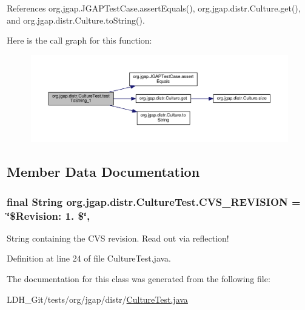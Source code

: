 References org.\-jgap.\-J\-G\-A\-P\-Test\-Case.\-assert\-Equals(), org.\-jgap.\-distr.\-Culture.\-get(), and org.\-jgap.\-distr.\-Culture.\-to\-String().



Here is the call graph for this function\-:
\nopagebreak
\begin{figure}[H]
\begin{center}
\leavevmode
\includegraphics[width=350pt]{classorg_1_1jgap_1_1distr_1_1_culture_test_a6d9643ccf90e461089fb2f6c8d7be6de_cgraph}
\end{center}
\end{figure}




\subsection{Member Data Documentation}
\hypertarget{classorg_1_1jgap_1_1distr_1_1_culture_test_a65511b98b2face0a144246cd3d2e6154}{
\subsubsection[{C\-V\-S\-\_\-\-R\-E\-V\-I\-S\-I\-O\-N}]{\setlength{\rightskip}{0pt plus 5cm}final String org.\-jgap.\-distr.\-Culture\-Test.\-C\-V\-S\-\_\-\-R\-E\-V\-I\-S\-I\-O\-N = \char`\"{}\$Revision\-: 1. \$\char`\"{}\hspace{0.3cm}{\ttfamily [static]}, {\ttfamily [private]}}}\label{classorg_1_1jgap_1_1distr_1_1_culture_test_a65511b98b2face0a144246cd3d2e6154}
String containing the C\-V\-S revision. Read out via reflection! 

Definition at line 24 of file Culture\-Test.\-java.



The documentation for this class was generated from the following file\-:\begin{DoxyCompactItemize}
\item 
L\-D\-H\-\_\-\-Git/tests/org/jgap/distr/\hyperlink{_culture_test_8java}{Culture\-Test.\-java}\end{DoxyCompactItemize}
